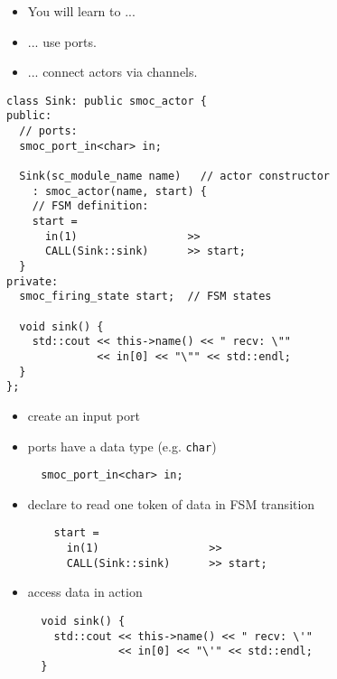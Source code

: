 \begin{frame}
\begin{itemize}
\item You will learn to ...
\item ... use ports.
\item ... connect actors via channels.
\end{itemize}
\end{frame}




\begin{frame}[fragile=singleslide]
\begin{lstlisting}
class Sink: public smoc_actor {
public:
  // ports:
  smoc_port_in<char> in;

  Sink(sc_module_name name)   // actor constructor
    : smoc_actor(name, start) {
    // FSM definition:
    start =
      in(1)                 >>
      CALL(Sink::sink)      >> start;
  }
private:
  smoc_firing_state start;  // FSM states

  void sink() {
    std::cout << this->name() << " recv: \""
              << in[0] << "\"" << std::endl;
  }
};
\end{lstlisting}
\end{frame}






\begin{frame}[fragile=singleslide]
\begin{itemize}
\item create an input port
\item ports have a data type (e.g. \lstinline!char!)
\begin{lstlisting}
  smoc_port_in<char> in;
\end{lstlisting}
\item declare to read one token of data in FSM transition
\begin{lstlisting}
    start =
      in(1)                 >>
      CALL(Sink::sink)      >> start;
\end{lstlisting}
\item access data in action
\begin{lstlisting}
  void sink() {
    std::cout << this->name() << " recv: \'"
              << in[0] << "\'" << std::endl;
  }
\end{lstlisting}
\end{itemize}
\end{frame}




